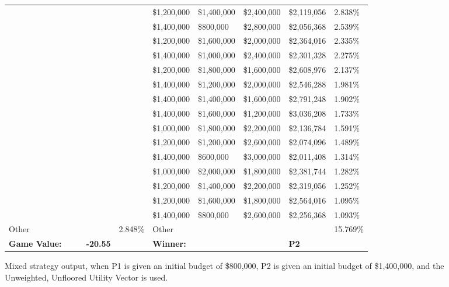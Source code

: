 \documentclass[11pt]{article}
\begin{document}
\begin{figure}
\begin{tabular}{ |p{1.0cm}p{1.0cm}p{1.0cm}p{2.0cm}|p{1.0cm}||p{1.0cm}p{1.0cm}p{1.0cm}p{2.0cm}|p{1.0cm}|}
& & & & & \$1,200,000 & \$1,400,000 & \$2,400,000 & \$2,119,056 & 2.838\% \\
& & & & & \$1,400,000 & \$800,000 & \$2,800,000 & \$2,056,368 & 2.539\% \\
& & & & & \$1,200,000 & \$1,600,000 & \$2,000,000 & \$2,364,016 & 2.335\% \\
& & & & & \$1,400,000 & \$1,000,000 & \$2,400,000 & \$2,301,328 & 2.275\% \\
& & & & & \$1,200,000 & \$1,800,000 & \$1,600,000 & \$2,608,976 & 2.137\% \\
& & & & & \$1,400,000 & \$1,200,000 & \$2,000,000 & \$2,546,288 & 1.981\% \\
& & & & & \$1,400,000 & \$1,400,000 & \$1,600,000 & \$2,791,248 & 1.902\% \\
& & & & & \$1,400,000 & \$1,600,000 & \$1,200,000 & \$3,036,208 & 1.733\% \\
& & & & & \$1,000,000 & \$1,800,000 & \$2,200,000 & \$2,136,784 & 1.591\% \\
& & & & & \$1,200,000 & \$1,200,000 & \$2,600,000 & \$2,074,096 & 1.489\% \\
& & & & & \$1,400,000 & \$600,000 & \$3,000,000 & \$2,011,408 & 1.314\% \\
& & & & & \$1,000,000 & \$2,000,000 & \$1,800,000 & \$2,381,744 & 1.282\% \\
& & & & & \$1,200,000 & \$1,400,000 & \$2,200,000 & \$2,319,056 & 1.252\% \\
& & & & & \$1,200,000 & \$1,600,000 & \$1,800,000 & \$2,564,016 & 1.095\% \\
& & & & & \$1,400,000 & \$800,000 & \$2,600,000 & \$2,256,368 & 1.093\% \\
\hline
Other& & & & 2.848\% & Other& & & & 15.769\% \\
\hline
\small \textbf{Game Value:} &&& \small \textbf{-20.55} && \small \textbf{Winner:} &&& \small \textbf{P2}&\\
\hline
\end{tabular}
\caption{Mixed strategy output, when P1 is given an initial budget of \$800,000, P2 is given an initial budget of \$1,400,000, and the Unweighted, Unfloored Utility Vector is used.}
\label{8v14table.4}
\end{figure}
\end{document}
